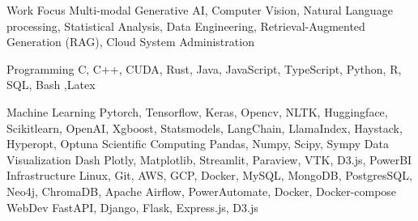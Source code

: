 

\begin{cvskills}


  \cvskill
    {Work Focus} %
    {Multi-modal Generative AI, Computer Vision, Natural Language processing, Statistical Analysis, Data Engineering, Retrieval-Augmented Generation (RAG), Cloud System Administration} %

  \cvskill
    {Programming} %
    {C, C++, CUDA, Rust, Java, JavaScript, TypeScript, Python, R, SQL, Bash ,Latex} %

  \cvskill
    {Machine Learning} %
    {Pytorch, Tensorflow, Keras, Opencv, NLTK, Huggingface, Scikitlearn, OpenAI, Xgboost, Statsmodels, LangChain, LlamaIndex, Haystack, Hyperopt, Optuna} %
  \cvskill
    {Scientific Computing}
    {Pandas, Numpy, Scipy,  Sympy}
  \cvskill
    {Data Visualization}
    {Dash Plotly, Matplotlib, Streamlit, Paraview, VTK, D3.js, PowerBI}
  \cvskill
    {Infrastructure}
    {Linux, Git, AWS, GCP, Docker, MySQL, MongoDB, PostgresSQL, Neo4j, ChromaDB, Apache Airflow, PowerAutomate, Docker, Docker-compose}
  \cvskill
    {WebDev}
    {FastAPI, Django, Flask, Express.js, D3.js}


\end{cvskills}
